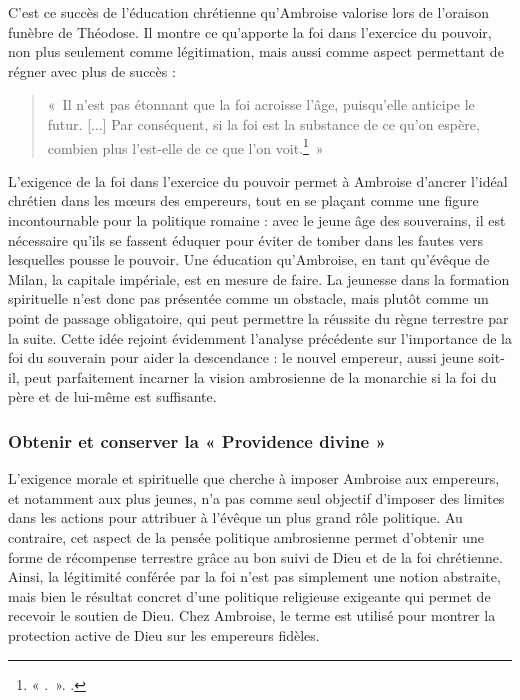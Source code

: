 \bigskip

C'est ce succès de l'éducation chrétienne qu'Ambroise valorise lors de l'oraison funèbre de Théodose. Il montre ce qu'apporte la foi dans l'exercice du pouvoir, non plus seulement comme légitimation, mais aussi comme aspect permettant de régner avec plus de succès :

\bigskip

\begin{quote}
«~Il n’est pas étonnant que la foi acroisse l’âge, puisqu’elle anticipe le futur. [...] Par conséquent, si la foi est la substance de ce qu’on espère, combien plus l’est-elle de ce que l'on voit.\footnote{« .~». \cite[]{ambroise_mort_theodose}.}~»
\end{quote}

\bigskip

L'exigence de la foi dans l'exercice du pouvoir permet à Ambroise d'ancrer l'idéal chrétien dans les mœurs des empereurs, tout en se plaçant comme une figure incontournable pour la politique romaine : avec le jeune âge des souverains, il est nécessaire qu'ils se fassent éduquer pour éviter de tomber dans les fautes vers lesquelles pousse le pouvoir. Une éducation qu'Ambroise, en tant qu'évêque de Milan, la capitale impériale, est en mesure de faire. La jeunesse dans la formation spirituelle n'est donc pas présentée comme un obstacle, mais plutôt comme un point de passage obligatoire, qui peut permettre la réussite du règne terrestre par la suite. Cette idée rejoint évidemment l'analyse précédente sur l'importance de la foi du souverain pour aider la descendance : le nouvel empereur, aussi jeune soit-il, peut parfaitement incarner la vision ambrosienne de la monarchie si la foi du père et de lui-même est suffisante.

\bigskip

\subsubsection{Obtenir et conserver la « Providence divine »}

L'exigence morale et spirituelle que cherche à imposer Ambroise aux empereurs, et notamment aux plus jeunes, n'a pas comme seul objectif d'imposer des limites dans les actions pour attribuer à l'évêque un plus grand rôle politique. Au contraire, cet aspect de la pensée politique ambrosienne permet d'obtenir une forme de récompense terrestre grâce au bon suivi de Dieu et de la foi chrétienne. Ainsi, la légitimité conférée par la foi n'est pas simplement une notion abstraite, mais bien le résultat concret d'une politique religieuse exigeante qui permet de recevoir le soutien de Dieu. Chez Ambroise, le terme  est utilisé pour montrer la protection active de Dieu sur les empereurs fidèles.

